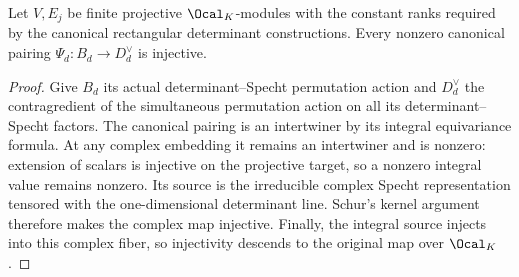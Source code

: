 \begin{lemma}
\label{lem:canonical-pairing-injective}
\leanok
{}
Let $V,E_j$ be finite projective $\Ocal_K$-modules with the constant
ranks required by the canonical rectangular determinant constructions.
Every nonzero canonical pairing
$\Psi_d:B_d\longrightarrow D_d^\vee$ is injective.
\end{lemma}
\begin{proof}
Give $B_d$ its actual determinant--Specht permutation action and
$D_d^\vee$ the contragredient of the simultaneous permutation action
on all its determinant--Specht factors. The canonical pairing is an
intertwiner by its integral equivariance formula. At any complex
embedding it remains an intertwiner and is nonzero: extension of
scalars is injective on the projective target, so a nonzero integral
value remains nonzero. Its source is the irreducible complex Specht
representation tensored with the one-dimensional determinant line.
Schur's kernel argument therefore makes the complex map injective.
Finally, the integral source injects into this complex fiber, so
injectivity descends to the original map over $\Ocal_K$.
\end{proof}

